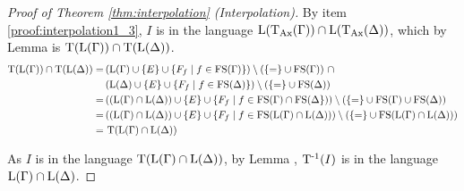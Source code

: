 \begin{proof}[Proof of Theorem \ref{thm:interpolation} (Interpolation)]
	By item \ref{proof:interpolation1_3}, $I$ is in the language $\operatorname{L}(\operatorname{\operatorname{T}_{Ax}}(\Gamma)) \cap \operatorname{L}(\operatorname{\operatorname{T}_{Ax}}(\Delta))$, which by Lemma  is $\Trans(\Lang(\Gamma)) \cap\nolinebreak \Trans(\Lang(\Delta)) $. 
	\begin{align*}
		\Trans(\Lang(\Gamma)) \cap\nolinebreak \Trans(\Lang(\Delta)) =\,&
		(\Lang(\Gamma)\cup \{E\}\cup\{F_f\mid f \in \FS(\Gamma)\}) \setminus(\{=\nolinebreak \} \cup\nolinebreak \FS(\Gamma))~\cap \\
	& (\Lang(\Delta)\cup \{E\}\cup\{F_f\mid f \in \FS(\Delta)\}) \setminus(\{=\nolinebreak \} \cup\nolinebreak \FS(\Delta))\\
		=\,& ((\Lang(\Gamma) \cap \Lang(\Delta)) \cup \{E\} \cup\{F_f\mid f \in \FS(\Gamma)\cap\FS(\Delta\}))  \setminus(\{=\} \cup \FS(\Gamma) \cup \FS(\Delta)) \\
		=\,& ((\Lang(\Gamma) \cap \Lang(\Delta)) \cup \{E\} \cup \{F_f\mid f\in \FS( \Lang(\Gamma) \cap \Lang(\Delta)) ) \setminus ( \{=\} \cup \FS(\Lang(\Gamma) \cap \Lang(\Delta)) )  \\ 
  =\,& \Trans(\Lang(\Gamma) \cap \Lang(\Delta))
	\end{align*}

	As $I$ is in the language $\operatorname{T}(\operatorname{L}(\Gamma) \cap \operatorname{L}(\Delta))$, by Lemma , $\operatorname{T^{-1}}(I)$ is in the language $\operatorname{L}(\Gamma) \cap \operatorname{L}(\Delta)$.
\end{proof}



